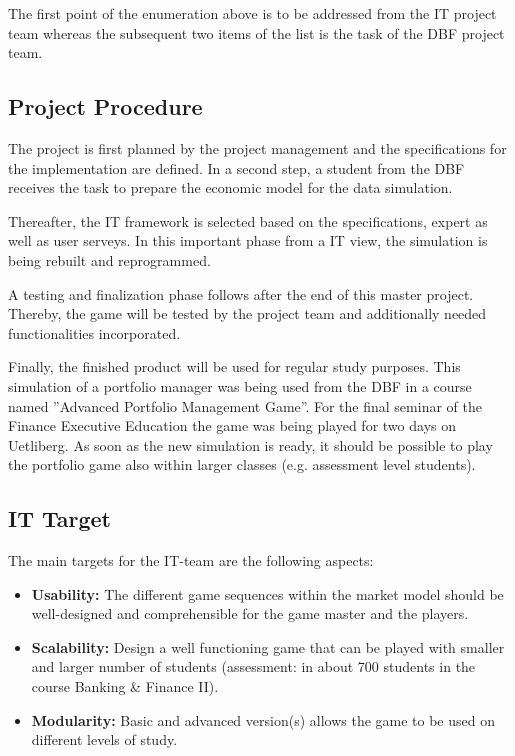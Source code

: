 The first point of the enumeration above is to be addressed from the IT project team whereas the subsequent two items of the list is the task of the DBF project team.


\subsection{Project Procedure}

The project is first planned by the project management and the specifications for the implementation are defined. In a second step, a student from the DBF receives the task to prepare the economic model for the data simulation.

Thereafter, the IT framework is selected based on the specifications, expert as well as user serveys. In this important phase from a IT view, the simulation is being rebuilt and reprogrammed.

A testing and finalization phase follows after the end of this master project. Thereby, the game will be tested by the project team and additionally needed functionalities incorporated.

Finally, the finished product will be used for regular study purposes. This simulation of a portfolio manager was being used from the DBF in a course named ''Advanced Portfolio Management Game''. For the final seminar of the Finance Executive Education the game was being played for two days on Uetliberg. As soon as the new simulation is ready, it should be possible to play the portfolio game also within larger classes (e.g. assessment level students).


\subsection{IT Target}
The main targets for the IT-team are the following aspects:
\begin{itemize}
  \item \textbf{Usability:} The different game sequences within the market model should be well-designed and comprehensible for the game master and the players.
  \item \textbf{Scalability:} Design a well functioning game that can be played with smaller and larger number of students (assessment: in about 700 students in the course Banking & Finance II).
  \item \textbf{Modularity:} Basic and advanced version(s) allows the game to be used on different levels of study.
\end{itemize}

